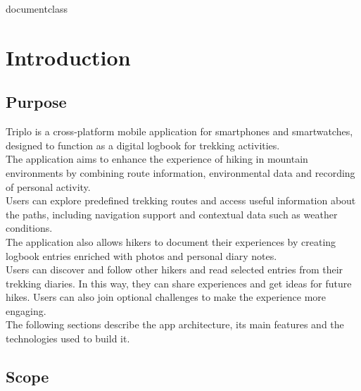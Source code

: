 \csname documentclass




\chapter{Introduction}
\label{Introduction}
\section{Purpose}










Triplo is a cross-platform mobile application for smartphones and smartwatches, designed to function as a digital logbook for trekking activities. \\
The application aims to enhance the experience of hiking in mountain environments by combining route information, environmental data and recording of personal activity. \\
Users can explore predefined trekking routes and access useful information about the paths, including navigation support and contextual data such as weather conditions.  \\
The application also allows hikers to document their experiences by creating logbook entries enriched with photos and personal diary notes. \\
Users can discover and follow other hikers and read selected entries from their trekking diaries. In this way, they can share experiences and get ideas for future hikes. 
Users can also join optional challenges to make the experience more engaging. \\
The following sections describe the app architecture, its main features and the technologies used to build it.











\section{Scope}

